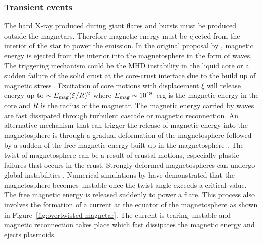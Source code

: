 \subsubsection{Transient events}
The hard X-ray produced during giant flares and bursts must be produced outside the magnetars. 
Therefore magnetic energy must be ejected from the interior of the star to power the emission.
In the original proposal by \citet{1995MNRAS.275..255T,1996ApJ...473..322T}, magnetic energy is ejected from the interior into the magnetosphere in the form of \alfven waves.
The triggering mechanism could be the MHD instability in the liquid core or a sudden failure of the solid crust at the core-crust interface due to the build up of magnetic stress \citep{1995MNRAS.275..255T,2001ApJ...561..980T}.
Excitation of core motions with displacement $\xi$ will release energy up to $\sim E_{\rm mag}(\xi/R)^2$ where $E_{\rm mag}\sim 10^{48}$~erg is the magnetic energy in the core and $R$ is the radius of the magnetar.
The magnetic energy carried by \alfven waves are fast dissipated through turbulent cascade or magnetic reconnection.
An alternative mechanism that can trigger the release of magnetic energy into the magnetosphere is through a gradual deformation of the magnetosphere followed by a sudden of the free magnetic energy built up in the magnetosphere \citep{2003MNRAS.346..540L,2010MNRAS.407.1926G, 2013ApJ...774...92P}.
The twist of magnetosphere can be a result of crustal motions, especially plastic failures that occurs in the crust.
Strongly deformed magnetospheres can undergo global instabilities \citep{2002ApJ...572..432U}.
Numerical simulations by \citep{2013ApJ...774...92P} have demonstrated that the magnetosphere becomes unstable once the twist angle exceeds a critical value.
The free magnetic energy is released suddenly to power a flare.
This process also involves the formation of a current at the equator of the magnetosphere as shown in Figure~\ref{fig:overtwisted-magnetar}.
The current is tearing unstable and magnetic reconnection takes place which fast dissipates the magnetic energy and ejects plasmoids.
%
